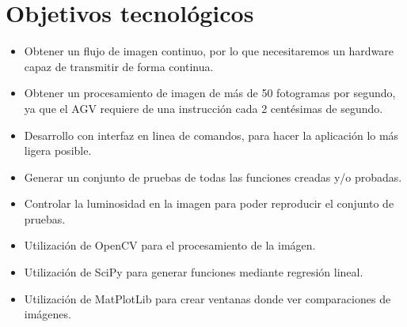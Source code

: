\section{Objetivos tecnológicos}
\begin{itemize}
	\item Obtener un flujo de imagen continuo, por lo que necesitaremos un hardware capaz de transmitir  de forma continua.
	
	\item Obtener un procesamiento de imagen de más de 50 fotogramas por segundo, ya que el AGV requiere de una instrucción cada 2 centésimas de segundo.
	
	\item Desarrollo con interfaz en linea de comandos, para hacer la aplicación lo más ligera posible.
	
	\item Generar un conjunto de pruebas de todas las funciones creadas y/o probadas.
	
	\item Controlar la luminosidad en la imagen para poder reproducir el conjunto de pruebas.
	
	\item Utilización de OpenCV para el procesamiento de la imágen.
	
	\item Utilización de SciPy para generar funciones mediante regresión lineal.
	
	\item Utilización de MatPlotLib para crear ventanas donde ver comparaciones de imágenes.
\end{itemize}
